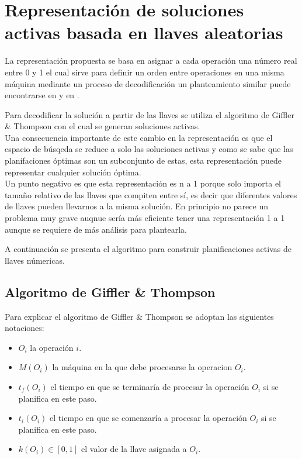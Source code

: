 \section{Representación de soluciones activas basada en llaves aleatorias}
La representación propuesta se basa en asignar a cada operación una número real entre 0 y 1 el cual sirve para definir un orden entre operaciones en una misma máquina mediante un proceso de decodificación un planteamiento similar puede encontrarse en \cite{norman1996random} y en \cite{Ponsich2013}.

Para decodificar la solución a partir de las llaves se utiliza el algoritmo de Giffler \& Thompson \cite{Giffler1960} con el cual se generan soluciones activas.\\ 

Una consecuencia importante de este cambio en la representación es que el espacio de búsqeda se reduce a solo las soluciones activas y como se sabe que las planifaciones óptimas son un subconjunto de estas, esta representación puede representar cualquier solución óptima. 
\\

Un punto negativo es que esta representación es n a 1 porque solo importa el tamaño relativo de las llaves que compiten entre sí, es decir que diferentes valores de llaves pueden llevarnos a la misma solución. En principio no parece un problema muy grave auqnue sería más eficiente tener una representación 1 a 1 aunque se requiere de más análisis para plantearla.

A continuación se presenta el algoritmo para construir planificaciones activas de llaves númericas.

\subsection{Algoritmo de Giffler \& Thompson}
Para explicar el algoritmo de Giffler \& Thompson se adoptan las siguientes notaciones:
\begin{itemize}
    \item $O_i$ la operación $i$.
    \item $M(O_i)$ la máquina en la que debe procesarse la operacion $O_i$.
    \item $t_f(O_i)$ el tiempo en que se terminaría de procesar la operación $O_i$ si se planifica en este paso.
    \item $t_i(O_i)$ el tiempo en que se comenzaría a procesar la operación $O_i$ si se planifica en este paso.
    \item $k(O_i)\in [0,1]$ el valor de la llave asignada a $O_i$.
\end{itemize}


